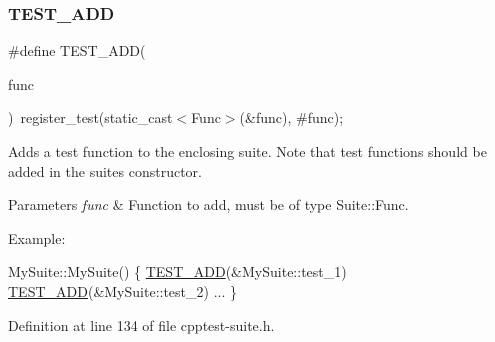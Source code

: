 \subsubsection{\texorpdfstring{T\+E\+S\+T\+\_\+\+A\+DD}{TEST\_ADD}}
{\footnotesize\ttfamily \#define T\+E\+S\+T\+\_\+\+A\+DD(\begin{DoxyParamCaption}\item[{}]{func }\end{DoxyParamCaption})~register\+\_\+test(static\+\_\+cast$<$Func$>$(\&func), \#func);}

Adds a test function to the enclosing suite. Note that test functions should be added in the suites constructor.


\begin{DoxyParams}{Parameters}
{\em func} & Function to add, must be of type Suite\+::\+Func.\\
\hline
\end{DoxyParams}
\begin{DoxyParagraph}{Example\+:}

\begin{DoxyCode}
MySuite::MySuite()
\{
    \mbox{\hyperlink{cpptest-suite_8h_abe8c3e0a2cf3893ebc1c265264ed9cb8}{TEST\_ADD}}(&MySuite::test\_1)
    \mbox{\hyperlink{cpptest-suite_8h_abe8c3e0a2cf3893ebc1c265264ed9cb8}{TEST\_ADD}}(&MySuite::test\_2)
    ...
\}
\end{DoxyCode}
 
\end{DoxyParagraph}


Definition at line 134 of file cpptest-\/suite.\+h.

